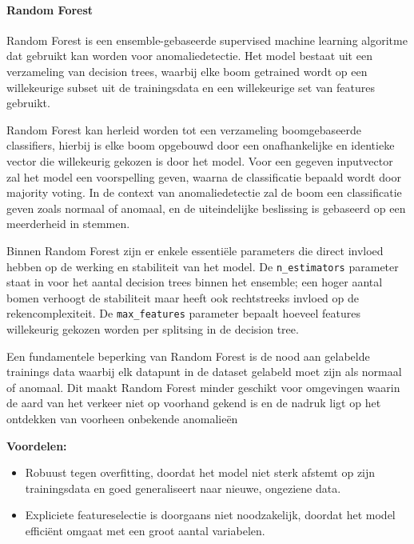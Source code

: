 \paragraph{Random Forest}

Random Forest is een ensemble-gebaseerde supervised machine learning algoritme dat gebruikt kan worden voor anomaliedetectie. 
Het model bestaat uit een verzameling van decision trees, waarbij elke boom getrained wordt op een willekeurige subset uit de trainingsdata en een willekeurige set van features gebruikt\autocite{Breiman2001}.

Random Forest kan herleid worden tot een verzameling boomgebaseerde classifiers, hierbij is elke boom opgebouwd door een onafhankelijke en identieke vector die willekeurig gekozen is door het model. 
Voor een gegeven inputvector zal het model een voorspelling geven, waarna de classificatie bepaald wordt door majority voting.
In de context van anomaliedetectie zal de boom een classificatie geven zoals normaal of anomaal, en de uiteindelijke beslissing is gebaseerd op een meerderheid in stemmen\autocite{Primartha2017}.

Binnen Random Forest zijn er enkele essentiële parameters die direct invloed hebben op de werking en stabiliteit van het model. 
De \texttt{n\_estimators} parameter staat in voor het aantal decision trees binnen het ensemble; een hoger aantal bomen verhoogt de stabiliteit maar heeft ook rechtstreeks invloed op de rekencomplexiteit. 
De \texttt{max\_features} parameter bepaalt hoeveel features willekeurig gekozen worden per splitsing in de decision tree\autocite{Breiman2001}.

Een fundamentele beperking van Random Forest is de nood aan gelabelde trainings data
waarbij elk datapunt in de dataset gelabeld moet zijn als normaal of anomaal. Dit maakt Random Forest minder geschikt voor omgevingen waarin de aard van het verkeer niet op voorhand gekend is en de nadruk ligt op het ontdekken van voorheen onbekende anomalieën~\autocite{Breiman2001}

\textbf{Voordelen:}
\begin{itemize}
    \item Robuust tegen overfitting, doordat het model niet sterk afstemt op
    zijn trainingsdata en goed generaliseert naar nieuwe, ongeziene data.
    \item Expliciete featureselectie is doorgaans niet noodzakelijk, doordat
    het model efficiënt omgaat met een groot aantal variabelen.
\end{itemize}


